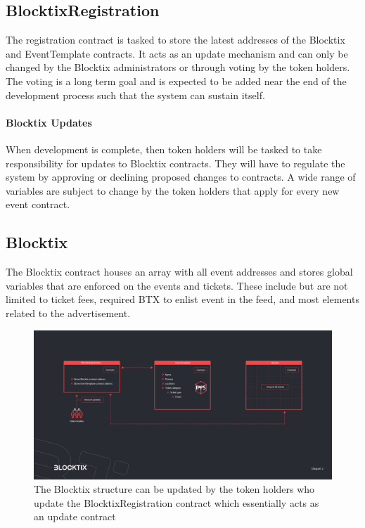 \documentclass[a4paper]{article}
\begin{document}
\subsection{BlocktixRegistration}
The registration contract is tasked to store the latest addresses of the Blocktix and EventTemplate contracts. It acts as an update mechanism and can only be changed by the Blocktix administrators or through voting by the token holders. The voting is a long term goal and is expected to be added near the end of the development process such that the system can sustain itself.



\paragraph{Blocktix Updates}
When development is complete, then token holders will be tasked to take responsibility for updates to Blocktix contracts. They will have to regulate the system by approving or declining proposed changes to contracts. A wide range of variables are subject to change by the token holders that apply for every new event contract. 

\subsection{Blocktix}
The Blocktix contract houses an array with all event addresses and stores global variables that are enforced on the events and tickets. These include but are not limited to ticket fees, required BTX to enlist event in the feed, and most elements related to the advertisement. 

\begin{figure}
\centering
\includegraphics[scale=0.22]{BTX-Diagram-2.jpg}
\caption{\label{fig:BTX-Diagram-2}The Blocktix structure can be updated by the token holders who update the BlocktixRegistration contract which essentially acts as an update contract}
\end{figure}
\end{document}
